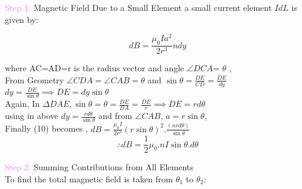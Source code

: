\documentclass{beamer}
\begin{document}
\begin{frame}
\textcolor{violet}{Step 1:} Magnetic Field Due to a Small Element
a small current element $I dL$ is given by:

  \begin{equation}
    dB = \frac{\mu_0 I a^2}{2 r^3}ndy 
    \end{equation}
    
where AC=AD=r is the radius vector and angle $\angle DCA$= $\theta$ ,\\
From Geometry $\angle CDA= \angle CAB=\theta$ and $\sin\theta=\frac{DE}{CD}=\frac{DE}{dy}$\\

\hspace{2cm} $dy=\frac{DE}{\sin\theta}  \implies DE=dy\sin\theta$\\

Again, In $\Delta DAE, \sin\theta=\theta=\frac{DE}{DA}=\frac{DE}{r} \implies DE=rd\theta$\\

using in above $dy=\frac{rd\theta}{\sin\theta}$ and from $\angle CAB$,  $ a=r\sin\theta$,\\

Finally  (10) becomes , $dB=\frac{\mu_0 I}{2r^3}(r\sin\theta)^2.\frac{(nrd\theta)}{\sin\theta}$\\

\begin{equation}
\therefore dB=\frac{1}{2}\mu_0.nI \sin\theta.d\theta
\end{equation}

\textcolor{violet}{Step 2:} Summing Contributions from All Elements\\

To find the total magnetic field is taken from  $\theta_1$ to $\theta_2$:\\ 

\end{frame}
\end{document}
